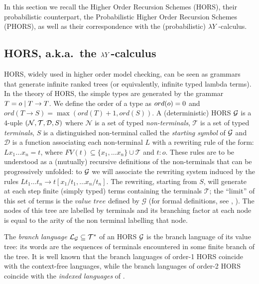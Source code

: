 In this section we recall the Higher Order Recursion Schemes (HORS), their probabilistic counterpart, the Probabilistic  Higher Order Recursion Schemes (PHORS), as well as their correspondence with the (probabilistic) $\lambda Y$-calculus. 

\subsection{HORS, a.k.a.~the $\lambda Y$-calculus}
HORS, widely used in higher order model checking, can be seen as grammars that generate infinite ranked trees (or equivalently, infinite typed lambda terms).
In the theory of HORS, the simple types are generated by the grammar $T= o \mid T \to T$. We define the order of a type as $ord(o) =0$ and $ord(T \to S)= \max(ord(T)+1, ord(S))$.
A (deterministic) HORS $\mathcal{G}$ is a 4-uple ${(\mathcal{N}, \mathcal{T}, \mathcal{D}, S)}$ where $\mathcal{N}$ is a set of typed \emph{non-terminals}, $\mathcal{T}$ is a set of typed \emph{terminals}, $S$ is a distinguished non-terminal called the \emph{starting symbol} of $\mathcal{G}$ and $\mathcal{D}$ is a function associating each non-terminal $L$ with a rewriting rule of the form:
$L x_1 \dots x_n = t$, where $FV(t) \subseteq \{x_1, \dots x_n\} \cup \mathcal{T}$ and $t:o$. These rules are to be understood as a (mutually) recursive definitions of the non-terminals that can be progressively unfolded: to $\mathcal{G}$ we will associate the rewriting system induced by the rules $L t_1 \dots t_n \to t[x_1/t_1, \dots x_n/t_n]$. The rewriting, starting from $S$, will generate at each step finite (simply typed) terms containing the terminals $\mathcal{T}$; the ``limit'' of this set of terms is the $\textit{value tree}$ defined by $\mathcal{G}$ (for formal definitions, see \cite{DBLP:conf/lics/Ong15}, \cite{DBLP:books/ems/21/CarayolS21}). The nodes of this tree are labelled by terminals and its branching factor at each node is equal to the arity of the non terminal labelling that node.  


The \emph{branch language} $\mathcal L_{\mathcal{G}}\subseteq \mathcal T^*$ of an HORS $\mathcal{G}$ is the branch language of its value tree: its words are the sequences of terminals encountered in some finite branch of the tree.
 It is well known that the branch languages of order-1 HORS coincide with the context-free languages, while the branch languages of order-2 HORS coincide with the \textit{indexed languages} of \cite{DBLP:conf/focs/Aho67}. 



